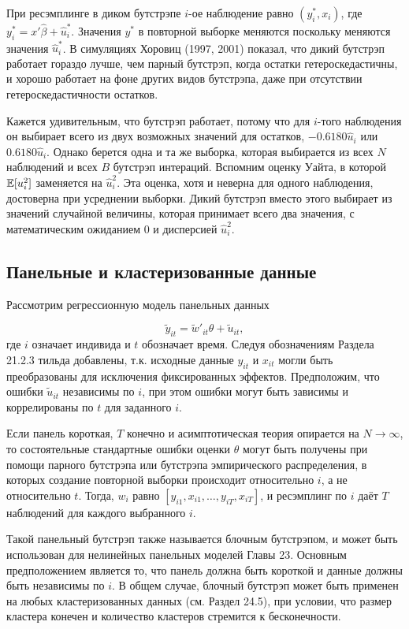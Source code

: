При ресэмплинге в диком бутстрэпе  $i$-ое наблюдение равно $(y^{*}_i,x_i)$, где $y^{*}_i=x'\hat{\beta}+\hat{u}^{*}_i$. Значения $y^{*}$ в повторной выборке меняются поскольку меняются значения $\hat{u}^{*}_i$. В симуляциях Хоровиц (1997, 2001)  показал, что дикий бутстрэп работает гораздо лучше, чем парный бутстрэп, когда остатки гетероскедастичны, и хорошо работает на фоне других видов бутстрэпа, даже при отсутствии гетероскедастичности остатков.

Кажется удивительным, что бутстрэп работает, потому что для $i$-того наблюдения он выбирает всего из двух возможных значений для остатков, $-0.6180\hat{u}_i$ или $0.6180\hat{u}_i$. Однако берется одна и та же выборка, которая выбирается из всех $N$ наблюдений и всех $B$ бутстрэп интераций. Вспомним оценку Уайта, в которой $\mathbb{E}[u_i^2]$ заменяется на $\hat{u}_i^2$. Эта оценка, хотя и неверна для одного наблюдения, достоверна при усреднении выборки. Дикий бутстрэп вместо этого выбирает из значений случайной величины, которая принимает всего два значения, с математическим ожиданием 0 и дисперсией $\hat{u}_i^2$.  

\subsection{Панельные и кластеризованные данные}

Рассмотрим регрессионную модель панельных данных

\[
\tilde{y}_{it}=\tilde{w}'_{it}\theta+\tilde{u}_{it},
\]
где $i$ означает индивида и $t$ обозначает время. Следуя обозначениям Раздела 21.2.3 тильда добавлены, т.к. исходные данные $y_{it}$ и $x_{it}$ могли быть преобразованы для исключения фиксированных эффектов. Предположим, что ошибки $\tilde{u}_{it}$ независимы по $i$, при этом ошибки могут быть зависимы и коррелированы по $t$ для заданного $i$. 

Если панель короткая, $T$ конечно и асимптотическая теория опирается на $N \rightarrow \infty$, то состоятельные стандартные ошибки оценки $\hat{\theta}$ могут быть получены при помощи парного бутстрэпа или бутстрэпа эмпирического распределения, в которых создание повторной выборки происходит относительно $i$, а не относительно $t$. Тогда, $w_i$ равно $[y_{i1},x_{i1},\ldots ,y_{iT},x_{iT}]$, и ресэмплинг по $i$ даёт $T$ наблюдений для каждого выбранного $i$.

Такой панельный бутстрэп также называется блочным бутстрэпом, и может быть использован для нелинейных панельных моделей Главы 23. Основным предположением является то, что панель должна быть короткой и данные должны быть независимы по $i$. В общем случае, блочный бутстрэп может быть применен на любых кластеризованных данных (см. Раздел 24.5), при условии, что размер кластера конечен и количество кластеров стремится к бесконечности.

